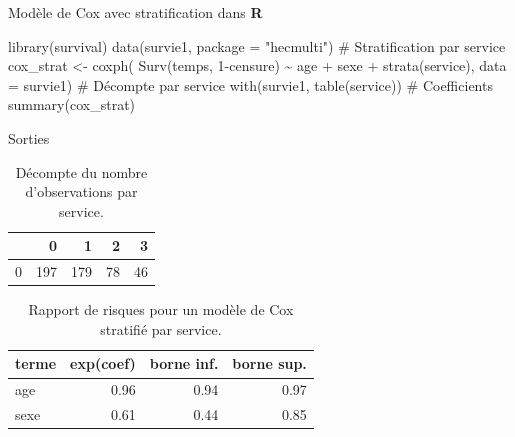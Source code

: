 \documentclass[
  ignorenonframetext,
]{beamer}
\newenvironment{Shaded}{\begin{snugshade}}{\end{snugshade}}
\newcommand{\AttributeTok}[1]{\textcolor[rgb]{0.40,0.45,0.13}{#1}}
\newcommand{\CommentTok}[1]{\textcolor[rgb]{0.37,0.37,0.37}{#1}}
\newcommand{\DecValTok}[1]{\textcolor[rgb]{0.68,0.00,0.00}{#1}}
\newcommand{\FunctionTok}[1]{\textcolor[rgb]{0.28,0.35,0.67}{#1}}
\newcommand{\NormalTok}[1]{\textcolor[rgb]{0.00,0.23,0.31}{#1}}
\newcommand{\OtherTok}[1]{\textcolor[rgb]{0.00,0.23,0.31}{#1}}
\newcommand{\SpecialCharTok}[1]{\textcolor[rgb]{0.37,0.37,0.37}{#1}}
\newcommand{\StringTok}[1]{\textcolor[rgb]{0.13,0.47,0.30}{#1}}
\begin{document}
\begin{frame}[fragile]{Modèle de Cox avec stratification dans
\textbf{R}}
\protect\hypertarget{moduxe8le-de-cox-avec-stratification-dans-r}{}
\begin{Shaded}
\begin{Highlighting}[numbers=left,,]
\FunctionTok{library}\NormalTok{(survival)}
\FunctionTok{data}\NormalTok{(survie1, }\AttributeTok{package =} \StringTok{"hecmulti"}\NormalTok{)}
\CommentTok{\# Stratification par service}
\NormalTok{cox\_strat }\OtherTok{\textless{}{-}} \FunctionTok{coxph}\NormalTok{(}
  \FunctionTok{Surv}\NormalTok{(temps, }\DecValTok{1}\SpecialCharTok{{-}}\NormalTok{censure) }\SpecialCharTok{\textasciitilde{}}\NormalTok{ age }\SpecialCharTok{+}\NormalTok{ sexe }\SpecialCharTok{+} \FunctionTok{strata}\NormalTok{(service), }
  \AttributeTok{data =}\NormalTok{ survie1)}
\CommentTok{\# Décompte par service}
\FunctionTok{with}\NormalTok{(survie1, }\FunctionTok{table}\NormalTok{(service))}
\CommentTok{\# Coefficients}
\FunctionTok{summary}\NormalTok{(cox\_strat)}
\end{Highlighting}
\end{Shaded}
\end{frame}

\begin{frame}{Sorties}
\protect\hypertarget{sorties}{}
\hypertarget{tbl-nserv}{}
\begin{table}
\caption{\label{tbl-nserv}Décompte du nombre d'observations par service. }\tabularnewline

\centering
\begin{tabular}{lrrrr}
\toprule
  & 0 & 1 & 2 & 3\\
\midrule
0 & 197 & 179 & 78 & 46\\
\bottomrule
\end{tabular}
\end{table}

\hypertarget{tbl-coxstratif}{}
\begin{table}
\caption{\label{tbl-coxstratif}Rapport de risques pour un modèle de Cox stratifié par service. }\tabularnewline

\centering
\begin{tabular}{lrrr}
\toprule
terme & exp(coef) & borne inf. & borne sup.\\
\midrule
age & 0.96 & 0.94 & 0.97\\
sexe & 0.61 & 0.44 & 0.85\\
\bottomrule
\end{tabular}
\end{table}
\end{frame}
\end{document}
